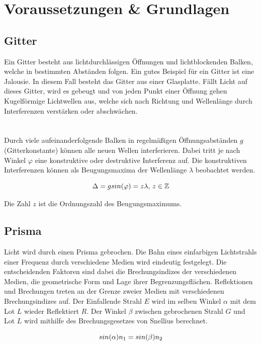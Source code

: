 \documentclass[12pt,a4paper,twoside]{article}
\begin{document}
\section{Voraussetzungen \& Grundlagen} %
\subsection{Gitter}
Ein Gitter besteht aus lichtdurchlässigen Öffnungen und lichtblockenden Balken, welche in bestimmten Abständen folgen. Ein gutes Beispiel für ein Gitter ist eine Jalousie. 
In diesem Fall besteht das Gitter aus einer Glasplatte. Fällt Licht auf dieses Gitter, wird es gebeugt und von jeden Punkt einer Öffnung gehen Kugelförmige Lichtwellen aus, welche sich nach Richtung und Wellenlänge durch Interferenzen verstärken oder abschwächen. 
\\
\\
\\
Durch viele aufeinanderfolgende Balken in regelmäßigen Öffnungsabständen $g$ (Gitterkonstante) können alle neuen Wellen interferieren. Dabei tritt je nach Winkel $\varphi$ eine konstruktive oder destruktive Interferenz auf. 
Die konstruktiven Interferenzen können als Beugungsmaxima der Wellenlänge $\lambda$ beobachtet werden. 

    \begin{equation}
        \label{eq:Gitterkonstante}
        \centerline{$\Delta=g sin(\varphi) = z\lambda$,     $z \in \mathbb{Z} $}
    \end{equation}

\noindent
Die Zahl $z$ ist die Ordnungszahl des Beugungsmaximums. 

\subsection{Prisma}
Licht wird durch einen Prisma gebrochen. 
Die Bahn eines einfarbigen Lichtstrahls einer Frequenz durch verschiedene Medien wird eindeutig festgelegt. Die entscheidenden Faktoren sind dabei die Brechungsindizes der verschiedenen Medien, die geometrische Form und Lage ihrer Begrenzungsflächen. 
Reflektionen und Brechungen treten an der Grenze zweier Medien mit verschiedenen Brechungsindizes auf. Der Einfallende Strahl $E$ wird im selben Winkel $\alpha$ mit dem Lot $L$ wieder Reflektiert $R$. 
Der Winkel $\beta$ zwischen gebrochenen Strahl $G$ und Lot $L$ wird mithilfe des Brechungsgesetzes von Snellius berechnet. 

\begin{equation}
    \label{eq:Snellius}
    \centerline{$sin(\alpha) n_1 = sin(\beta) n_2$}
\end{equation}
\end{document}
